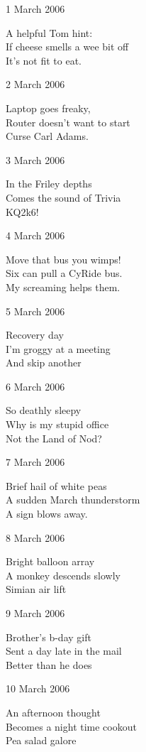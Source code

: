 \documentclass[12pt]{article}
\begin{document}
\setlength{\parskip}{1mm}

1 March 2006

A helpful Tom hint: \\
If cheese smells a wee bit off \\
It's not fit to eat.

\newpage

2 March 2006

Laptop goes freaky, \\
Router doesn't want to start \\
Curse Carl Adams.


3 March 2006

In the Friley depths \\
Comes the sound of Trivia \\
KQ2k6!


4 March 2006

Move that bus you wimps! \\
Six can pull a CyRide bus. \\
My screaming helps them.


5 March 2006

Recovery day \\
I'm groggy at a meeting \\
And skip another


6 March 2006

So deathly sleepy \\
Why is my stupid office \\
Not the Land of Nod?


7 March 2006

Brief hail of white peas \\
A sudden March thunderstorm \\
A sign blows away.


\newpage

8 March 2006

Bright balloon array \\
A monkey descends slowly \\
Simian air lift


9 March 2006

Brother's b-day gift \\
Sent a day late in the mail \\
Better than he does


10 March 2006
 
An afternoon thought \\
Becomes a night time cookout \\
Pea salad galore
\end{document}
